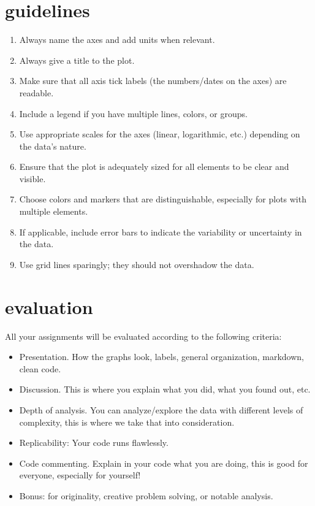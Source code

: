 \documentclass[
  letterpaper,
  DIV=11,
  numbers=noendperiod,
  oneside]{scrreprt}
\providecommand{\tightlist}{%
  \setlength{\itemsep}{0pt}\setlength{\parskip}{0pt}}\usepackage{longtable,booktabs,array}
\begin{document}
\hypertarget{guidelines}{%
\section{guidelines}\label{guidelines}}

\begin{enumerate}
\def\labelenumi{\arabic{enumi}.}
\tightlist
\item
  Always name the axes and add units when relevant.
\item
  Always give a title to the plot.
\item
  Make sure that all axis tick labels (the numbers/dates on the axes)
  are readable.
\item
  Include a legend if you have multiple lines, colors, or groups.
\item
  Use appropriate scales for the axes (linear, logarithmic, etc.)
  depending on the data's nature.
\item
  Ensure that the plot is adequately sized for all elements to be clear
  and visible.
\item
  Choose colors and markers that are distinguishable, especially for
  plots with multiple elements.
\item
  If applicable, include error bars to indicate the variability or
  uncertainty in the data.
\item
  Use grid lines sparingly; they should not overshadow the data.
\end{enumerate}

\hypertarget{evaluation}{%
\section{evaluation}\label{evaluation}}

All your assignments will be evaluated according to the following
criteria:

\begin{itemize}
\tightlist
\item
  Presentation. How the graphs look, labels, general organization,
  markdown, clean code.
\item
  Discussion. This is where you explain what you did, what you found
  out, etc.
\item
  Depth of analysis. You can analyze/explore the data with different
  levels of complexity, this is where we take that into consideration.
\item
  Replicability: Your code runs flawlessly.
\item
  Code commenting. Explain in your code what you are doing, this is good
  for everyone, especially for yourself!
\item
  Bonus: for originality, creative problem solving, or notable analysis.
\end{itemize}
\end{document}
